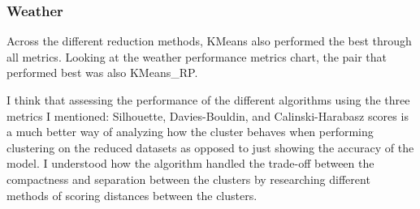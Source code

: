 \documentclass[conference]{IEEEtran}
\begin{document}
\subsubsection{Weather}{
Across the different reduction methods, KMeans also performed the best through all metrics. Looking at the weather performance metrics chart, the pair that performed best was also KMeans\_RP.
}
\par I think that assessing the performance of the different algorithms using the three metrics I mentioned: Silhouette, Davies-Bouldin, and Calinski-Harabasz scores is a much better way of analyzing how the cluster behaves when performing clustering on the reduced datasets as opposed to just showing the accuracy of the model. I understood how the algorithm handled the trade-off between the compactness and separation between the clusters by researching different methods of scoring distances between the clusters.
\end{document}
